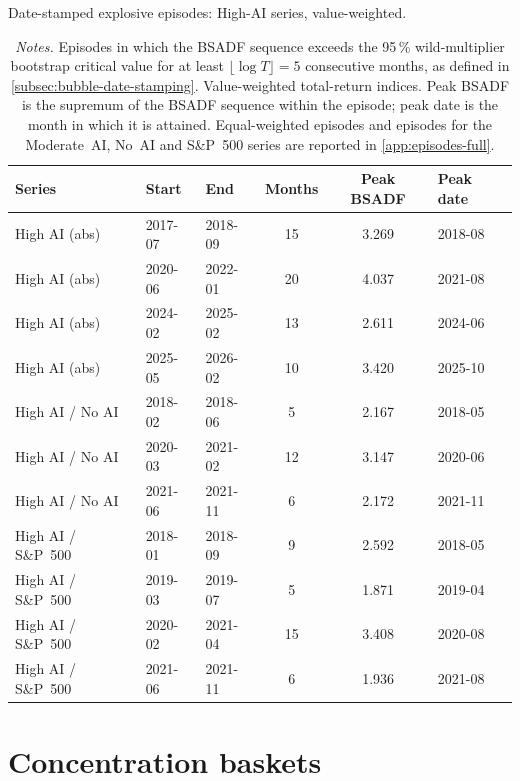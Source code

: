 \begin{table}[H]
\centering
\caption{Date-stamped explosive episodes: High-AI series, value-weighted.}
\label{tab:episodes-headline}
\small
\begin{tabular}{l l l S[table-format=2.0] S[table-format=1.3] l}
\toprule
Series & Start & End & {Months} & {Peak BSADF} & Peak date \\
\midrule
High AI (abs)        & 2017-07 & 2018-09 & 15 & 3.269 & 2018-08 \\
High AI (abs)        & 2020-06 & 2022-01 & 20 & 4.037 & 2021-08 \\
High AI (abs)        & 2024-02 & 2025-02 & 13 & 2.611 & 2024-06 \\
High AI (abs)        & 2025-05 & 2026-02 & 10 & 3.420 & 2025-10 \\
High AI / No AI      & 2018-02 & 2018-06 &  5 & 2.167 & 2018-05 \\
High AI / No AI      & 2020-03 & 2021-02 & 12 & 3.147 & 2020-06 \\
High AI / No AI      & 2021-06 & 2021-11 &  6 & 2.172 & 2021-11 \\
High AI / S\&P~500   & 2018-01 & 2018-09 &  9 & 2.592 & 2018-05 \\
High AI / S\&P~500   & 2019-03 & 2019-07 &  5 & 1.871 & 2019-04 \\
High AI / S\&P~500   & 2020-02 & 2021-04 & 15 & 3.408 & 2020-08 \\
High AI / S\&P~500   & 2021-06 & 2021-11 &  6 & 1.936 & 2021-08 \\
\bottomrule
\end{tabular}
\caption*{\footnotesize \textit{Notes.} Episodes in which the BSADF sequence exceeds the 95\,\% wild-multiplier bootstrap critical value for at least $\lfloor \log T \rfloor = 5$ consecutive months, as defined in \cref{subsec:bubble-date-stamping}. Value-weighted total-return indices. Peak BSADF is the supremum of the BSADF sequence within the episode; peak date is the month in which it is attained. Equal-weighted episodes and episodes for the Moderate~AI, No~AI and S\&P~500 series are reported in \cref{app:episodes-full}.}
\end{table}

 
\section{Concentration baskets}
\label{sec:results-concentration}
 
